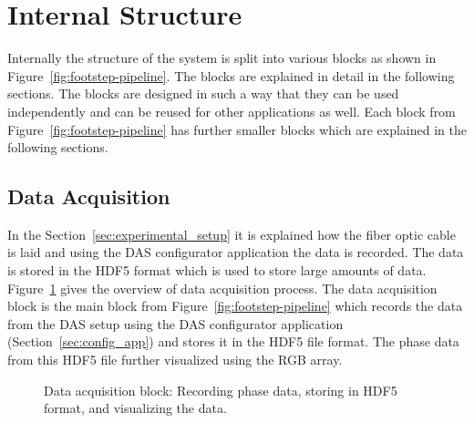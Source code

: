 \section{Internal Structure}
Internally the structure of the system is split into various blocks as shown in Figure~\ref{fig:footstep-pipeline}. The blocks are explained in detail in the following sections. The blocks are designed in such a way that they can be used independently and can be reused for other applications as well. Each block from Figure~\ref{fig:footstep-pipeline} has further smaller blocks which are explained in the following sections. 

\subsection{Data Acquisition}\label{sec:data_acquisition}
In the Section~\ref{sec:experimental_setup} it is explained how the fiber optic cable is laid and using the DAS configurator application the data is recorded. The data is stored in the HDF5 format which is used to store large amounts of data. Figure~\ref{fig:daq-simple} gives the overview of data acquisition process. The data acquisition block is the main block from Figure~\ref{fig:footstep-pipeline} which records the data from the DAS setup using the DAS configurator application (Section~\ref{sec:config_app}) and stores it in the HDF5 file format. The phase data from this HDF5 file further visualized using the RGB array.

\begin{figure}[ht]
  \centering
  \caption{Data acquisition block: Recording phase data, storing in HDF5 format, and visualizing the data.}
  \label{fig:daq-simple}
\end{figure}

